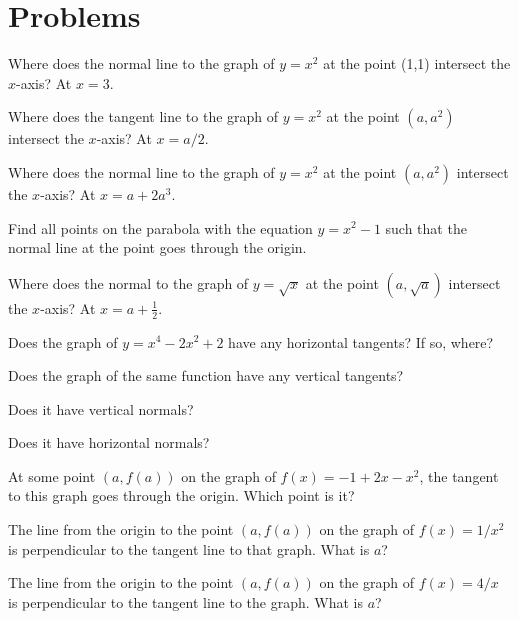 \section{Problems} %
\problemfont %
\begin{multicols}{2}\setlength{\parindent}{0pt}
\problem Where does the normal line to the graph of $y=x^2$ at the point (1,1) %
intersect the $x$-axis?
\answer %
At $x=3$.
\endanswer

\problem Where does the tangent line to the graph of $y=x^2$ at the point $(a, a^2)$ %
intersect the $x$-axis?
\answer %
At $x=a/2$.  
\endanswer




\problem Where does the normal line to the graph of $y=x^2$ at the point $(a, a^2)$ %
intersect the $x$-axis?
\answer %
At $x=a+2a^3$.  
\endanswer




\problem Find all points on the parabola with the equation $y = x^2 %
-1$ such that the normal line at the point goes through the origin.




\problem Where does the normal to the graph of $y=\sqrt x$ at the point $(a, %
\sqrt{a})$
intersect the $x$-axis?
\answer %
At $x=a+\frac12$.  
\endanswer








\problem Does the graph of $y=x^4-2x^2+2$ have any horizontal tangents?  If %
so, where? 

Does the graph of the same function have any vertical tangents?

Does it have vertical normals?

Does it have horizontal normals?


\problem At some point $(a, f(a))$ on the graph of $f(x) = -1+2x-x^2$, %
the tangent to this graph goes through the origin.  Which
point is it?




\problem The line from the origin to the point $(a, f(a))$ on the graph of $f(x) %
= 1/x^2$ is perpendicular to the tangent line to that graph.  What is $a$?




\problem The line from the origin to the point $(a, f(a))$ on the graph of $f(x) %
= 4/x$ is perpendicular to the tangent line to the graph.  What is $a$?





\end{multicols}
